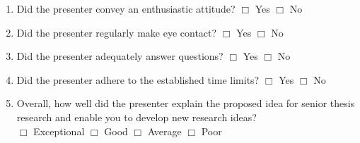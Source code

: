 \documentclass[letterpaper, 10pt]{article} %
\begin{document}
{\begin{enumerate}
\item Did the presenter convey an enthusiastic attitude? \hspace*{.05in}
  $\Box$ Yes \hspace*{.05in} $\Box$ No

\item Did the presenter regularly make eye contact? \hspace*{.05in}
  $\Box$ Yes \hspace*{.05in} $\Box$ No

\item Did the presenter adequately answer questions? \hspace*{.05in}
  $\Box$ Yes \hspace*{.05in} $\Box$ No

\item Did the presenter adhere to the established time limits? \hspace*{.05in}
  $\Box$ Yes \hspace*{.05in} $\Box$ No

\item Overall, how well did the presenter explain the proposed idea
  for senior thesis research and enable you to develop new research
  ideas?  \\ \hspace*{.05in} $\Box$ Exceptional \hspace*{.05in} $\Box$
  Good \hspace*{.05in} $\Box$ Average \hspace*{.05in} $\Box$ Poor

\end{enumerate}

}
\end{document}
